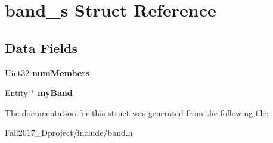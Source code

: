 \hypertarget{structband__s}{}\section{band\+\_\+s Struct Reference}
\label{structband__s}
\subsection*{Data Fields}
\begin{DoxyCompactItemize}
\item 
\mbox{\label{structband__s_a9dbdd428ed64607e0c0fc9eedbf396b8}} 
Uint32 {\bfseries num\+Members}
\item 
\mbox{\label{structband__s_a4fe5b3acf1bffd136d6e49c9ad1c620d}} 
\hyperlink{structentity__s}{Entity} $\ast$ {\bfseries my\+Band}
\end{DoxyCompactItemize}


The documentation for this struct was generated from the following file\+:\begin{DoxyCompactItemize}
\item 
Fall2017\+\_\+Dproject/include/band.\+h\end{DoxyCompactItemize}
